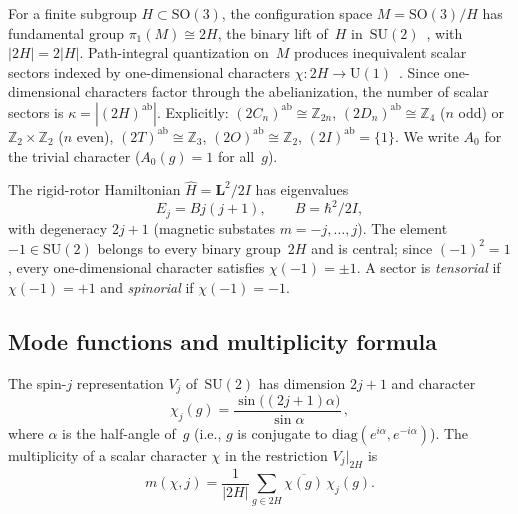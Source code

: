 \documentclass[12pt]{article}
\theoremstyle{definition}
\theoremstyle{remark}
\newcommand{\ZZ}{\mathbb{Z}}
\newcommand{\SU}{\mathrm{SU}}
\newcommand{\SO}{\mathrm{SO}}
\newcommand{\UU}{\mathrm{U}}
\begin{document}
For a finite subgroup $H \subset \SO(3)$, the configuration
space $M = \SO(3)/H$ has fundamental group
$\pi_1(M) \cong 2H$, the binary lift of~$H$
in~$\SU(2)$~\cite{Mermin1979}, with $|2H| = 2|H|$.
Path-integral quantization on~$M$ produces inequivalent
scalar sectors indexed by one-dimensional characters
$\chi \colon 2H \to \UU(1)$~\cite{Schulman1968, LaidlawDeWitt1971,
ImboSudarshan1988, FinkelsteinRubinstein1968,
Giulini1995, BalachandranEtAl1983, Mouchet2021}.
Since one-dimensional characters factor through the
abelianization, the number of scalar sectors is
$\kappa = |(2H)^{\mathrm{ab}}|$.
Explicitly: $(2C_n)^{\mathrm{ab}} \cong \ZZ_{2n}$,
$(2D_n)^{\mathrm{ab}} \cong \ZZ_4$ ($n$ odd) or
$\ZZ_2 \times \ZZ_2$ ($n$ even),
$(2T)^{\mathrm{ab}} \cong \ZZ_3$,
$(2O)^{\mathrm{ab}} \cong \ZZ_2$,
$(2I)^{\mathrm{ab}} = \{1\}$.
We write $A_0$ for the trivial character
($A_0(g) = 1$ for all~$g$).

The rigid-rotor Hamiltonian $\hat{H} = \mathbf{L}^2/2I$ has
eigenvalues
\begin{equation}
  \label{eq:energy}
  E_j = Bj(j{+}1), \qquad B = \hbar^2/2I,
\end{equation}
with degeneracy $2j{+}1$ (magnetic substates
$m = -j, \ldots, j$).
The element $-1 \in \SU(2)$ belongs to every binary
group~$2H$ and is central; since $(-1)^2 = 1$, every
one-dimensional character satisfies $\chi(-1) = \pm 1$.
A sector is \emph{tensorial} if $\chi(-1) = +1$ and
\emph{spinorial} if $\chi(-1) = -1$.

\subsection{Mode functions and multiplicity formula}
\label{sec:modes}

The spin-$j$ representation $V_j$ of~$\SU(2)$ has
dimension $2j{+}1$ and character
\begin{equation}
  \label{eq:su2-character}
  \chi_j(g)
  = \frac{\sin\bigl((2j{+}1)\alpha\bigr)}{\sin\alpha}\,,
\end{equation}
where $\alpha$ is the half-angle of~$g$
(i.e., $g$ is conjugate to
$\mathrm{diag}(e^{i\alpha}, e^{-i\alpha})$).
The multiplicity of a scalar character $\chi$ in the
restriction $V_j|_{2H}$ is~\cite{BrockerTomDieck1985}
\begin{equation}
  \label{eq:multiplicity}
  m(\chi, j)
  = \frac{1}{|2H|}\sum_{g \in 2H}
    \overline{\chi(g)}\,\chi_j(g).
\end{equation}
\end{document}
